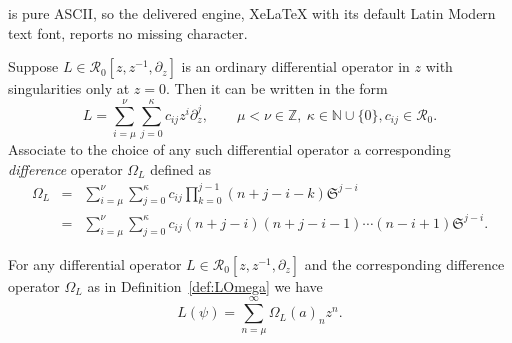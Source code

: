 \documentclass[10pt,a4paper]{amsart}
\def\N{\mathbb{N}}
\def\R{\mathcal{R}}
\def\S{\mathfrak{S}}
\def\Z{\mathbb{Z}}
\def\dmax{\kappa}
\def\zmax{\nu}
\def\zmin{\mu}
\begin{document}
is pure ASCII, so the delivered engine, XeLaTeX with its default Latin Modern text font, reports no missing character.
\begin{definition}\label{def:LOmega}
Suppose $L\in \R_0[z,z^{-1},\partial_z]$ is an ordinary differential
operator in $z$ with singularities only at $z=0$.   Then it can be written in the form
$$
L=\sum_{i=\zmin}^{\zmax}\sum_{j=0}^{\dmax} c_{ij}z^{i}\partial_z^{j},
\qquad
\zmin<\zmax\in\Z,\ \dmax\in\N\cup\{0\}, c_{ij}\in\R_0.
$$
Associate to the choice of any such differential operator a
corresponding \textit{difference} operator $\Omega_L$ defined as
\begin{eqnarray*}
\Omega_L&=&\sum_{i=\zmin}^{\zmax}\sum_{j=0}^{\dmax} c_{ij}
\prod_{k=0}^{j-1}(n+j-i-k) \S^{j-i}  \\
  &=&\sum_{i=\zmin}^{\zmax}\sum_{j=0}^{\dmax} c_{ij}
(n+j-i)(n+j-i-1)\cdots(n-i+1) \S^{j-i}.
\end{eqnarray*}
\end{definition}

\begin{lemma}\label{lem:main} For any differential operator $L\in\R_0[z,z^{-1},\partial_z]$ and
  the corresponding difference operator $\Omega_L$ as in
  Definition~\ref{def:LOmega} we have
$$
L(\psi)=\sum_{n=\zmin}^{\infty} \Omega_L(a)_nz^n.
$$
\end{lemma}
\end{document}
